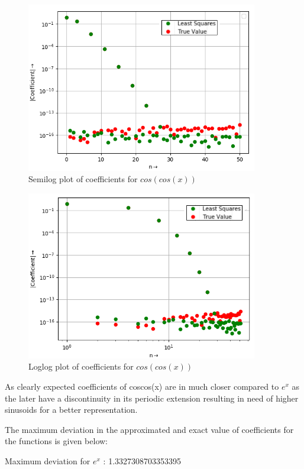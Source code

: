 \documentclass[10pt,a4paper]{article}
\begin{document}
\begin{figure}[!tbh]
\includegraphics[width = 0.9\textwidth]{5b1.png}
\caption{Semilog plot of coefficients for $cos(cos(x))$}
\end{figure} 


\begin{figure}[!tbh]
\includegraphics[width = 0.9\textwidth]{5b2.png}
\caption{Loglog plot of coefficients for $cos(cos(x))$}
\end{figure} 

As clearly expected coefficients of coscos(x) are in much closer compared to $e^{x}$ as the later have a discontinuity in its periodic 
extension resulting in need of higher sinusoids for a better representation.

The maximum deviation in the approximated and exact value of coefficients for the functions is given below:

Maximum deviation for $e^{x}$   : 1.3327308703353395
\end{document}
